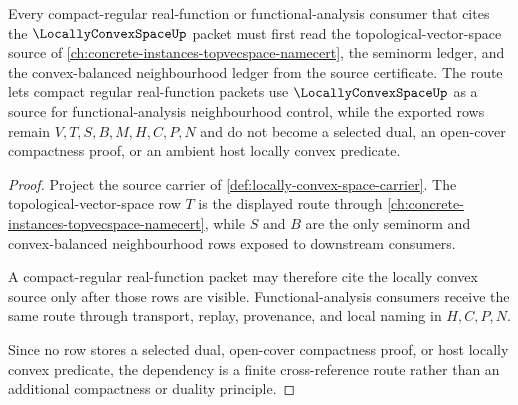 \begin{theorem}
\label{thm:locally-convex-space-compact-regular-function-route}
Every compact-regular real-function or functional-analysis consumer that cites the $\LocallyConvexSpaceUp$ packet must first read the topological-vector-space source of \autoref{ch:concrete-instances-topvecspace-namecert}, the seminorm ledger, and the convex-balanced neighbourhood ledger from the source certificate. The route lets compact regular real-function packets use $\LocallyConvexSpaceUp$ as a source for functional-analysis neighbourhood control, while the exported rows remain $V,T,S,B,M,H,C,P,N$ and do not become a selected dual, an open-cover compactness proof, or an ambient host locally convex predicate.
\end{theorem}
\begin{proof}
Project the source carrier of \autoref{def:locally-convex-space-carrier}. The topological-vector-space row $T$ is the displayed route through \autoref{ch:concrete-instances-topvecspace-namecert}, while $S$ and $B$ are the only seminorm and convex-balanced neighbourhood rows exposed to downstream consumers.

A compact-regular real-function packet may therefore cite the locally convex source only after those rows are visible. Functional-analysis consumers receive the same route through transport, replay, provenance, and local naming in $H,C,P,N$.

Since no row stores a selected dual, open-cover compactness proof, or host locally convex predicate, the dependency is a finite cross-reference route rather than an additional compactness or duality principle.
\end{proof}
